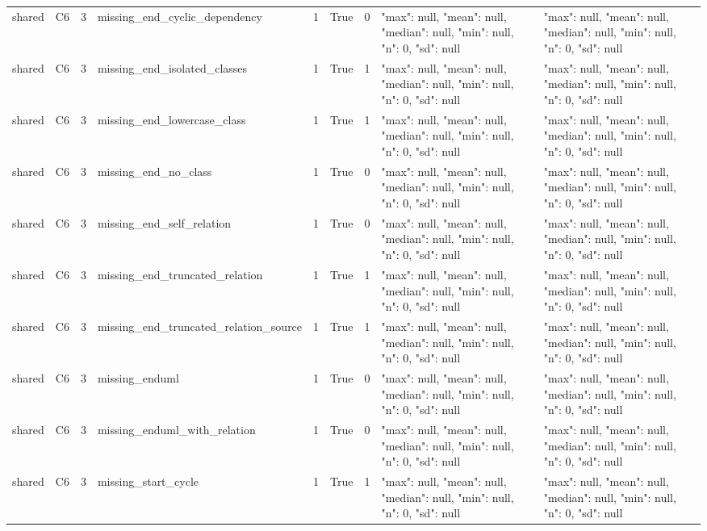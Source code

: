 \begin{tabular}{lllllllll}
shared & C6 & 3 & missing\_end\_cyclic\_dependency & 1 & True & 0 & {"max": null, "mean": null, "median": null, "min": null, "n": 0, "sd": null} & {"max": null, "mean": null, "median": null, "min": null, "n": 0, "sd": null} \\
shared & C6 & 3 & missing\_end\_isolated\_classes & 1 & True & 1 & {"max": null, "mean": null, "median": null, "min": null, "n": 0, "sd": null} & {"max": null, "mean": null, "median": null, "min": null, "n": 0, "sd": null} \\
shared & C6 & 3 & missing\_end\_lowercase\_class & 1 & True & 1 & {"max": null, "mean": null, "median": null, "min": null, "n": 0, "sd": null} & {"max": null, "mean": null, "median": null, "min": null, "n": 0, "sd": null} \\
shared & C6 & 3 & missing\_end\_no\_class & 1 & True & 0 & {"max": null, "mean": null, "median": null, "min": null, "n": 0, "sd": null} & {"max": null, "mean": null, "median": null, "min": null, "n": 0, "sd": null} \\
shared & C6 & 3 & missing\_end\_self\_relation & 1 & True & 0 & {"max": null, "mean": null, "median": null, "min": null, "n": 0, "sd": null} & {"max": null, "mean": null, "median": null, "min": null, "n": 0, "sd": null} \\
shared & C6 & 3 & missing\_end\_truncated\_relation & 1 & True & 1 & {"max": null, "mean": null, "median": null, "min": null, "n": 0, "sd": null} & {"max": null, "mean": null, "median": null, "min": null, "n": 0, "sd": null} \\
shared & C6 & 3 & missing\_end\_truncated\_relation\_source & 1 & True & 1 & {"max": null, "mean": null, "median": null, "min": null, "n": 0, "sd": null} & {"max": null, "mean": null, "median": null, "min": null, "n": 0, "sd": null} \\
shared & C6 & 3 & missing\_enduml & 1 & True & 0 & {"max": null, "mean": null, "median": null, "min": null, "n": 0, "sd": null} & {"max": null, "mean": null, "median": null, "min": null, "n": 0, "sd": null} \\
shared & C6 & 3 & missing\_enduml\_with\_relation & 1 & True & 0 & {"max": null, "mean": null, "median": null, "min": null, "n": 0, "sd": null} & {"max": null, "mean": null, "median": null, "min": null, "n": 0, "sd": null} \\
shared & C6 & 3 & missing\_start\_cycle & 1 & True & 1 & {"max": null, "mean": null, "median": null, "min": null, "n": 0, "sd": null} & {"max": null, "mean": null, "median": null, "min": null, "n": 0, "sd": null} \\

\end{tabular}
